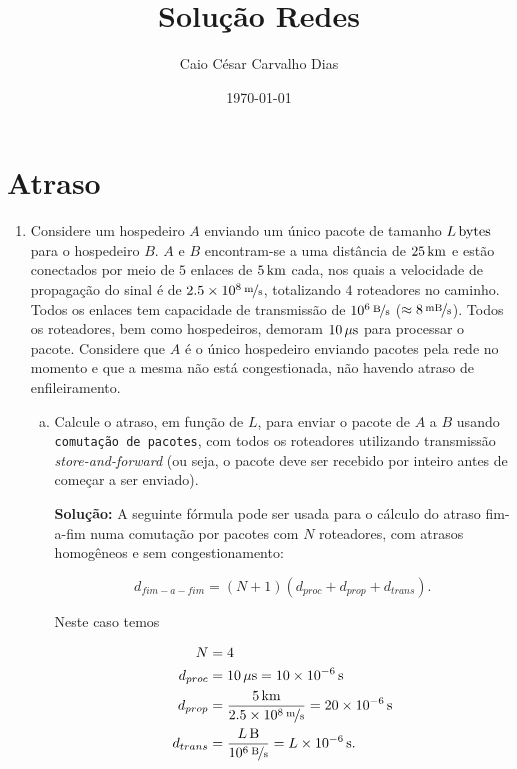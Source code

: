 \documentclass{article}
\title{Solução Redes}
\author{Caio César Carvalho Dias}
\date{\today}
\begin{document}
\maketitle

\section*{Atraso}
\begin{enumerate}
\item 
Considere um hospedeiro $A$ enviando um único pacote de tamanho $\unit[L]{bytes}$ para o hospedeiro $B$. $A$ e $B$ encontram-se a uma distância de $\unit[25]{km}$ e estão conectados por meio de $5$ enlaces de $\unit[5]{km}$ cada, nos quais a velocidade de propagação do sinal é de $\unitfrac[2.5 \times 10^8]{m}{s}$, totalizando $4$ roteadores no caminho. Todos os enlaces tem capacidade de transmissão de $\unitfrac[10^6]{B}{s}$ ($\approx \unitfrac[8]{mB}{s}$). Todos os roteadores, bem como hospedeiros, demoram $\unit[10]{\mu s}$ para processar o pacote. Considere que $A$ é o único hospedeiro enviando pacotes pela rede no momento e que a mesma não está congestionada, não havendo atraso de enfileiramento.

\begin{enumerate}[a)]
\item Calcule o atraso, em função de $L$, para enviar o pacote de $A$ a $B$ usando \texttt{comutação de pacotes}, com todos os roteadores utilizando transmissão \textit{store-and-forward} (ou seja, o pacote deve ser recebido por inteiro antes de começar a ser enviado).

\begin{addmargin}[0.5in]{0.5in}
\par \textbf{Solução:} A seguinte fórmula pode ser usada para o cálculo do atraso fim-a-fim numa comutação por pacotes com $N$ roteadores, com atrasos homogêneos e sem congestionamento:

$$d_{fim-a-fim} = (N + 1)(d_{proc} + d_{prop} + d_{trans}).$$

Neste caso temos

\begin{equation} \label{eq1}
\begin{split}
N & = 4 \\
d_{proc} & = \unit[10]{\mu s} = \unit[10 \times 10^{-6}]{s}\\
d_{prop} & = \frac{\unit[5]{km}}{\unitfrac[2.5 \times 10^8]{m}{s}} = \unit[20 \times 10^{-6}]{s}\\
d_{trans} & = \frac{\unit[L]{B}}{\unitfrac[10^6]{B}{s}} = \unit[L \times 10^{-6}]{s}.
\end{split}
\end{equation}


\end{addmargin}
\end{enumerate}
\end{enumerate}
\end{document}
